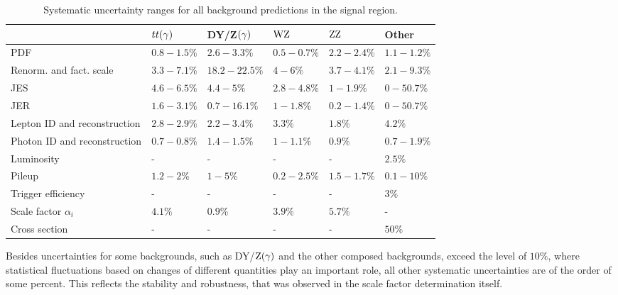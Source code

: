 \begin{table}[tbp]
 \centering
 \caption{Systematic uncertainty ranges for all background predictions in the signal region.}
 \small
 \label{tab:systuncBKG}
 \begin{tabular}[width=\textwidth]{llllll}
                               & $tt(\gamma)$  & DY/Z$(\gamma)$  & $\mathrm{W}\mathrm{Z}$    & $\mathrm{Z}\mathrm{Z}$    & Other       \\\hline
  PDF                          & $0.8-1.5\%$ & $2.6-3.3\%$   & $0.5-0.7\%$ & $2.2-2.4\%$ & $1.1-1.2\%$ \\
  Renorm. and fact. scale      & $3.3-7.1\%$ & $18.2-22.5\%$ & $4-6\%$     & $3.7-4.1\%$ & $2.1-9.3\%$ \\
  JES                          & $4.6-6.5\%$ & $4.4-5\%$     & $2.8-4.8\%$ & $1-1.9\%$   & $0-50.7\%$  \\
  JER                          & $1.6-3.1\%$ & $0.7-16.1\%$  & $1-1.8\%$   & $0.2-1.4\%$ & $0-50.7\%$  \\
  Lepton ID and reconstruction & $2.8-2.9\%$ & $2.2-3.4\%$   & $3.3\%$     & $1.8\%$     & $4.2\%$     \\
  Photon ID and reconstruction & $0.7-0.8\%$ & $1.4-1.5\%$   & $1-1.1\%$   & $0.9\%$     & $0.7-1.9\%$ \\
  Luminosity                   & -           & -             & -           & -           & $2.5\%$     \\
  Pileup                       & $1.2-2\%$   & $1-5\%$       & $0.2-2.5\%$ & $1.5-1.7\%$ & $0.1-10\%$  \\
  Trigger efficiency           & -           & -             & -           & -           & $3\%$       \\
  Scale factor $\alpha_{i}$    & $4.1\%$     & $0.9\%$       & $3.9\%$     & $5.7\%$     & -           \\
  Cross section                & -           & -             & -           & -           & $50\%$      \\
  \hline
 \end{tabular}
\end{table}
Besides uncertainties for some backgrounds, such as DY/$\mathrm{Z}(\gamma)$ and the other composed backgrounds, exceed the level of $10\%$, where statistical fluctuations based on changes of different quantities play an important role, all other systematic uncertainties are of the order of some percent. This reflects the stability and robustness, that was observed in the scale factor determination itself.


